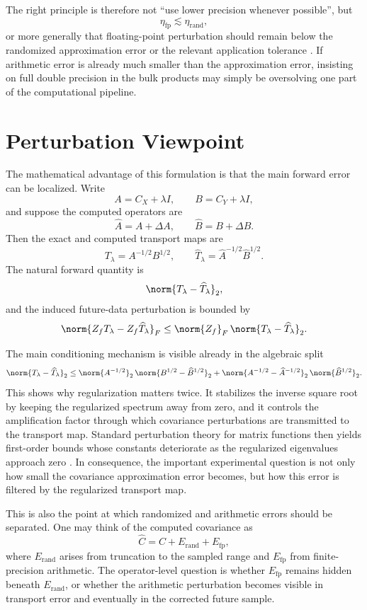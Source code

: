 The right principle is therefore not ``use lower precision whenever possible'', but
\[
	\eta_{\mathrm{fp}} \lesssim \eta_{\mathrm{rand}},
\]
or more generally that floating-point perturbation should remain below the randomized approximation error or the relevant application tolerance \autocite{carson2026balancing}. If arithmetic error is already much smaller than the approximation error, insisting on full double precision in the bulk products may simply be oversolving one part of the computational pipeline.

\section{Perturbation Viewpoint}

The mathematical advantage of this formulation is that the main forward error can be localized. Write
\[
	A = C_X + \lambda I, \qquad B = C_Y + \lambda I,
\]
and suppose the computed operators are
\[
	\widehat A = A + \Delta A, \qquad \widehat B = B + \Delta B.
\]
Then the exact and computed transport maps are
\[
	T_\lambda = A^{-1/2}B^{1/2},
	\qquad
	\widehat T_\lambda = \widehat A^{-1/2}\widehat B^{1/2}.
\]
The natural forward quantity is
\[
	\norm{T_\lambda - \widehat T_\lambda}_2,
\]
and the induced future-data perturbation is bounded by
\[
	\norm{Z_f T_\lambda - Z_f \widehat T_\lambda}_F
	\le
	\norm{Z_f}_F\, \norm{T_\lambda - \widehat T_\lambda}_2.
\]

The main conditioning mechanism is visible already in the algebraic split
\[
	\norm{T_\lambda - \widehat T_\lambda}_2
	\le
	\norm{A^{-1/2}}_2\,\norm{B^{1/2} - \widehat B^{1/2}}_2
	+
	\norm{A^{-1/2} - \widehat A^{-1/2}}_2\,\norm{\widehat B^{1/2}}_2.
\]
This shows why regularization matters twice. It stabilizes the inverse square root by keeping the regularized spectrum away from zero, and it controls the amplification factor through which covariance perturbations are transmitted to the transport map. Standard perturbation theory for matrix functions then yields first-order bounds whose constants deteriorate as the regularized eigenvalues approach zero \autocite{higham2008functions}. In consequence, the important experimental question is not only how small the covariance approximation error becomes, but how this error is filtered by the regularized transport map.

This is also the point at which randomized and arithmetic errors should be separated. One may think of the computed covariance as
\[
	\widehat C = C + E_{\mathrm{rand}} + E_{\mathrm{fp}},
\]
where $E_{\mathrm{rand}}$ arises from truncation to the sampled range and $E_{\mathrm{fp}}$ from finite-precision arithmetic. The operator-level question is whether $E_{\mathrm{fp}}$ remains hidden beneath $E_{\mathrm{rand}}$, or whether the arithmetic perturbation becomes visible in transport error and eventually in the corrected future sample.

